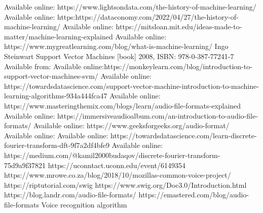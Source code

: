 \documentclass[english,12pt,oneside,a4paper]{article}
\begin{document}
\begin{center}
	\begin{thebibliography}{15}
		Available online: https://www.lightsondata.com/the-history-of-machine-learning/
		Available online: https:https://dataconomy.com/2022/04/27/the-history-of-machine-learning/
		Available online: https://mitsloan.mit.edu/ideas-made-to-matter/machine-learning-explained
		Available online: https://www.mygreatlearning.com/blog/what-is-machine-learning/
		Ingo Steinwart Support Vector Machines [book] 2008, ISBN: 978-0-387-77241-7
		Available from: 
		Available online:https://monkeylearn.com/blog/introduction-to-support-vector-machines-svm/
		Available online: https://towardsdatascience.com/support-vector-machine-introduction-to-machine-learning-algorithms-934a444fca47
		Available online:
		https://www.masteringthemix.com/blogs/learn/audio-file-formats-explained
		Available online: 
		https://immersiveaudioalbum.com/an-introduction-to-audio-file-formats/
		Available online:
		https://www.geeksforgeeks.org/audio-format/
		Available online:
		Available online:
		https://towardsdatascience.com/learn-discrete-fourier-transform-dft-9f7a2df4bfe9
		Available online:
		https://medium.com/@kamil2000budaqov/discrete-fourier-transform-75d9a9f37821
		https://uconntact.uconn.edu/event/6149354
		https://www.mrowe.co.za/blog/2018/10/mozillas-common-voice-project/
		https://riptutorial.com/swig
		https://www.swig.org/Doc3.0/Introduction.html
		https://blog.landr.com/audio-file-formats/
		https://emastered.com/blog/audio-file-formats
		 Voice recognition algorithm
	\end{thebibliography}
\end{center}
\end{document}
